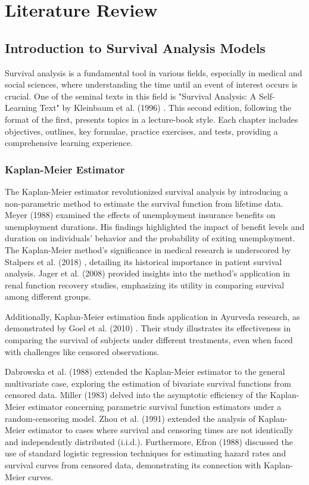 \chapter{Literature Review} \label{Chap2}
\section{Introduction to Survival Analysis Models}
Survival analysis is a fundamental tool in various fields, especially in medical and social sciences, where understanding the time until an event of interest occurs is crucial. One of the seminal texts in this field is "Survival Analysis: A Self-Learning Text" by Kleinbaum et al. (1996) \cite{kleinbaum1996survival}. This second edition, following the format of the first, presents topics in a lecture-book style. Each chapter includes objectives, outlines, key formulae, practice exercises, and tests, providing a comprehensive learning experience.

\subsection{Kaplan-Meier Estimator}
The Kaplan-Meier estimator \cite{kaplan1958nonparametric} revolutionized survival analysis by introducing a non-parametric method to estimate the survival function from lifetime data. Meyer (1988) \cite{meyer1988unemployment} examined the effects of unemployment insurance benefits on unemployment durations. His findings highlighted the impact of benefit levels and duration on individuals' behavior and the probability of exiting unemployment. The Kaplan-Meier method's significance in medical research is underscored by Stalpers et al. (2018) \cite{stalpers2018edward}, detailing its historical importance in patient survival analysis. Jager et al. (2008) \cite{jager2008analysis} provided insights into the method's application in renal function recovery studies, emphasizing its utility in comparing survival among different groups.

Additionally, Kaplan-Meier estimation finds application in Ayurveda research, as demonstrated by Goel et al. (2010) \cite{goel2010understanding}. Their study illustrates its effectiveness in comparing the survival of subjects under different treatments, even when faced with challenges like censored observations.

Dabrowska et al. (1988) \cite{dabrowska1988kaplan} extended the Kaplan-Meier estimator to the general multivariate case, exploring the estimation of bivariate survival functions from censored data. Miller (1983) \cite{miller1983price} delved into the asymptotic efficiency of the Kaplan-Meier estimator concerning parametric survival function estimators under a random-censoring model. Zhou et al. (1991) \cite{zhou1991some} extended the analysis of Kaplan-Meier estimator to cases where survival and censoring times are not identically and independently distributed (i.i.d.). Furthermore, Efron (1988) \cite{efron1988logistic} discussed the use of standard logistic regression techniques for estimating hazard rates and survival curves from censored data, demonstrating its connection with Kaplan-Meier curves.

